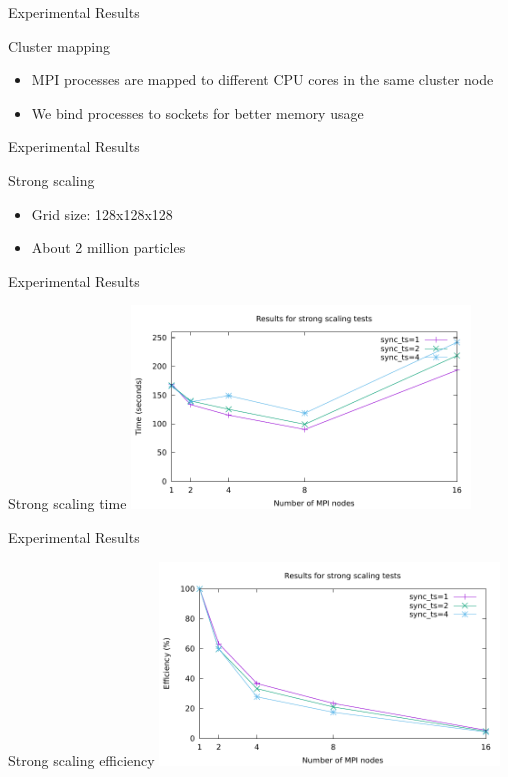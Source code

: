 \documentclass[aspectratio=43,t]{beamer}
\begin{document}
  \begin{frame}{Experimental Results}
    \begin{block}{Cluster mapping}
      \begin{itemize}
        \item MPI processes are mapped to different CPU cores in the same cluster node
        \item We bind processes to sockets for better memory usage
      \end{itemize}
    \end{block}
  \end{frame}

  \begin{frame}{Experimental Results}
    \begin{block}{Strong scaling}
      \begin{itemize}
        \item Grid size: 128x128x128
        \item About 2 million particles
      \end{itemize}
    \end{block}
  \end{frame}

  \begin{frame}{Experimental Results}
    \begin{block}{Strong scaling time}
      \includegraphics[width=9cm]{results/strong_scaling.pdf}
    \end{block}
  \end{frame}

  \begin{frame}{Experimental Results}
    \begin{block}{Strong scaling efficiency}
      \includegraphics[width=9cm]{results/strong_scaling_eff.pdf}
    \end{block}
  \end{frame}
\end{document}
